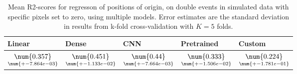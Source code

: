 \begin{table}
\centering
\caption{
Mean R2-scores for regresson of positions of origin, on double events in simulated data with specific pixels
set to zero, using multiple models. 
Error estimates are the standard deviation in results from k-fold cross-validation 
with $K=5$ folds.
}
\label{tab:regression-simulated-double-position-pixelmod-r2}
\begin{tabular}{lllll}
\toprule
                                             Linear &                                               Dense &                                                CNN &                                          Pretrained &                                              Custom \\
\midrule
 $\underset{\num{+- 7.864e-03 }  }{\num{ 0.357 } }$ &  $\underset{\num{+- 1.133e-02 }  }{\num{ 0.451 } }$ &  $\underset{\num{+- 7.664e-03 }  }{\num{ 0.44 } }$ &  $\underset{\num{+- 1.506e-02 }  }{\num{ 0.333 } }$ &  $\underset{\num{+- 1.781e-01 }  }{\num{ 0.224 } }$ \\
\bottomrule
\end{tabular}
\end{table}

